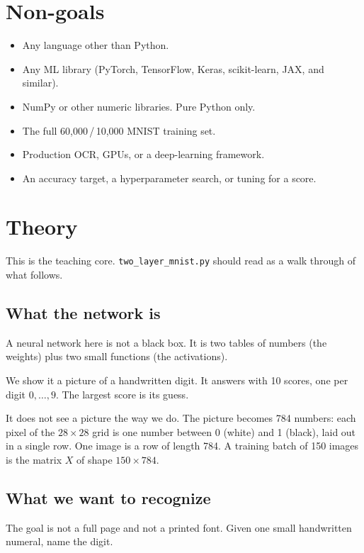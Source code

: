 \documentclass[11pt]{article}
\begin{document}
\section*{Non-goals}

\begin{itemize}
  \item Any language other than Python.
  \item Any ML library (PyTorch, TensorFlow, Keras, scikit-learn, JAX, and similar).
  \item NumPy or other numeric libraries. Pure Python only.
  \item The full 60{,}000\,/\,10{,}000 MNIST training set.
  \item Production OCR, GPUs, or a deep-learning framework.
  \item An accuracy target, a hyperparameter search, or tuning for a score.
\end{itemize}

\section*{Theory}

This is the teaching core. \texttt{two\_layer\_mnist.py} should read as a walk through of what follows.

\subsection*{What the network is}

A neural network here is not a black box. It is two tables of numbers (the weights) plus two small functions (the activations).

We show it a picture of a handwritten digit. It answers with 10 scores, one per digit $0,\ldots,9$. The largest score is its guess.

It does not see a picture the way we do. The picture becomes 784 numbers: each pixel of the $28\times 28$ grid is one number between 0 (white) and 1 (black), laid out in a single row. One image is a row of length 784. A training batch of 150 images is the matrix $X$ of shape $150\times 784$.

\subsection*{What we want to recognize}

The goal is not a full page and not a printed font. Given one small handwritten numeral, name the digit.
\end{document}
